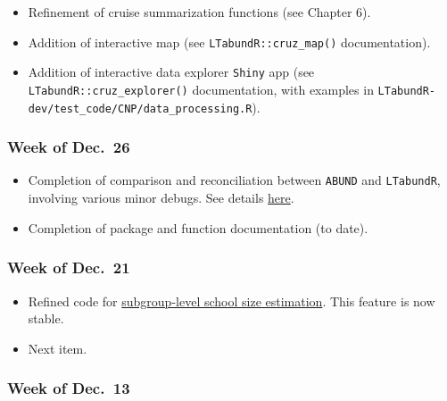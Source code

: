 \documentclass[
]{book}
\begin{document}
\begin{itemize}
\item
  Refinement of cruise summarization functions (see Chapter 6).
\item
  Addition of interactive map (see \texttt{LTabundR::cruz\_map()} documentation).
\item
  Addition of interactive data explorer \texttt{Shiny} app (see \texttt{LTabundR::cruz\_explorer()} documentation, with examples in \texttt{LTabundR-dev/test\_code/CNP/data\_processing.R}).
\end{itemize}

\hypertarget{week-of-dec.-26}{%
\subsubsection*{Week of Dec.~26}\label{week-of-dec.-26}}

\begin{itemize}
\item
  Completion of comparison and reconciliation between \texttt{ABUND} and \texttt{LTabundR}, involving various minor debugs. See details \href{https://docs.google.com/presentation/d/1Vv0Yb2_gk0cEC1OlXlm6ffL9ug99bYvkpLkczg6pb2Q/edit?usp=sharing}{here}.
\item
  Completion of package and function documentation (to date).
\end{itemize}

\hypertarget{week-of-dec.-21}{%
\subsubsection*{Week of Dec.~21}\label{week-of-dec.-21}}

\begin{itemize}
\item
  Refined code for \protect\hyperlink{subgroups}{subgroup-level school size estimation}. This feature is now stable.
\item
  Next item.
\end{itemize}

\hypertarget{week-of-dec.-13}{%
\subsubsection*{Week of Dec.~13}\label{week-of-dec.-13}}
\end{document}
